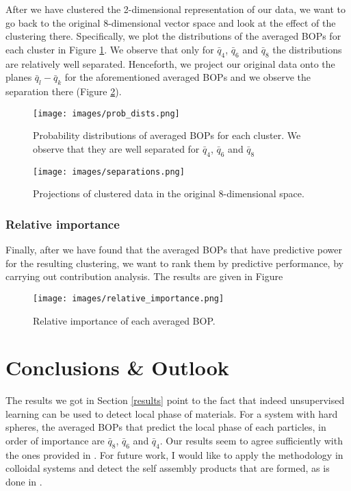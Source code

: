 \documentclass{article}
\begin{document}
After we have clustered the 2-dimensional representation of our data, we want to go back to the original 8-dimensional vector space and look at the effect of the clustering there. Specifically, we plot the distributions of the averaged BOPs for each cluster in Figure \ref{fig:prob_dists}. We observe that only for $\bar q_4$, $\bar q_6$ and $\bar q_8$ the distributions are relatively well separated. Henceforth, we project our original data onto the planes $\bar q_l-\bar q_k$ for the aforementioned averaged BOPs and we observe the separation there (Figure \ref{fig:separations}).

\begin{figure}[!htbp]
	\centering
	\texttt{[image: images/prob\_dists.png]}
	\caption{Probability distributions of averaged BOPs for each cluster. We observe that they are well separated for $\bar q_4$, $\bar q_6$ and $\bar q_8$}
	\label{fig:prob_dists}
\end{figure}

\begin{figure}[!htbp]
	\texttt{[image: images/separations.png]}	
	\caption{Projections of clustered data in the original 8-dimensional space.}
	\label{fig:separations}
\end{figure}



\subsubsection{Relative importance}

Finally, after we have found that the averaged BOPs that have predictive power for the resulting clustering, we want to rank them by predictive performance, by carrying out contribution analysis. The results are given in Figure

\begin{figure}[!htpb]
	\centering
	\texttt{[image: images/relative\_importance.png]}
	\caption{Relative importance of each averaged BOP. }
	\label{fig:relative_importance}
\end{figure}

\section{Conclusions \& Outlook}\label{conclusion}

The results we got in Section \ref{results} point to the fact that indeed unsupervised learning can be used to detect local phase of materials. For a system with hard spheres, the averaged BOPs that predict the local phase of each particles, in order of importance are $\bar q_8$, $\bar q_6$ and $\bar q_4$. Our results seem to agree sufficiently with the ones provided in \cite{main}. For future work, I would like to apply the methodology in colloidal systems and detect the self assembly products that are formed, as is done in \cite{main}.
\end{document}
